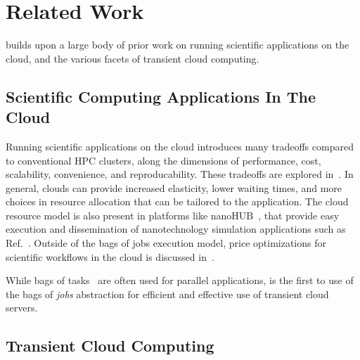 \section{Related Work}
\label{sec:related}
\sysname builds upon a large body of prior work on running scientific applications on the cloud, and the various facets of transient cloud computing.  

\subsection{Scientific Computing Applications In The Cloud}

Running scientific applications on the cloud introduces many tradeoffs compared to conventional HPC clusters, along the dimensions of performance, cost, scalability, convenience, and reproducability.
These tradeoffs are explored in~\cite{iosup_performance_2011, zhai_cloud_2011, marathe2013comparative, galante_analysis_2016, benedictis_cloud-aware_2014, hpc-sci-buyya}. 
In general, clouds can provide increased elasticity, lower waiting times, and more choices in resource allocation that can be tailored to the application.
The cloud resource model is also present in platforms like nanoHUB~\cite{nanohub}, that provide easy execution and dissemination of nanotechnology simulation applications such as Ref.~\cite{kadupitiya2017}.
Outside of the bags of jobs execution model, price optimizations for scientific workflows in the cloud is discussed in~\cite{gari_learning_2019}. 

While bags of tasks~\cite{varshney_autobot_2019} are often used for parallel applications, \sysname is the first to use of the bags of \emph{jobs} abstraction for efficient and effective use of transient cloud servers. 


\subsection{Transient Cloud Computing}

